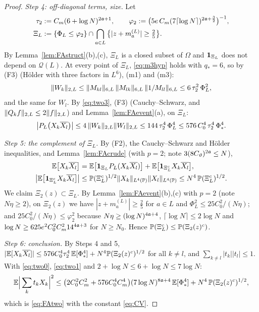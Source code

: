 \begin{proof}
\emph{Step 4: off-diagonal terms, size.} Let
\begin{align*}
 \tau_2&:=C_m(6+\log N)^{2\mathfrak{a}+1},\qquad\varphi_2:=\big(5e\,C_m(7\lceil\log N\rceil)^{2\mathfrak{a}+\frac32}\big)^{-1},\\
 \Xi_L&:=\{\Phi_L\le\varphi_2\}\cap\bigcap_{a\in L}\big\{|z+m_a^{(L)}|\ge\tfrac25\big\}.
\end{align*}
By Lemma~\ref{lem:FAstruct}(b),(c), $\Xi_L$ is a closed subset of $\Omega$ and $\mathbf{1}_{\Xi_L}$ does not depend on $\mathcal Q(L)$. At every point of $\Xi_L$, \eqref{eq:m3hyp} holds with $q_*=6$, so by (F3) (H\"older with three factors in $L^6$), (m1) and (m3):
\[
 \|W_k\|_{2,L}\le\|M_{kl}\|_{6,L}\,\|M_{lk}\|_{6,L}\,\|1/M_{ll}\|_{6,L}\le6\,\tau_2^2\,\Phi_L^2,
\]
and the same for $W_l$. By \eqref{eq:two3}, (F3) (Cauchy--Schwarz, and $\|Q_kf\|_{2,L}\le2\|f\|_{2,L}$) and Lemma~\ref{lem:FAevent}(a), on $\Xi_L$:
\begin{equation}\label{eq:two4}
 \big|P_L\big(X_k\overline{X_l}\big)\big|\le4\,\|W_k\|_{2,L}\|W_l\|_{2,L}\le144\,\tau_2^4\,\Phi_L^4\le576\,C_0^4\,\tau_2^4\,\Phi_*^4 .
\end{equation}

\emph{Step 5: the complement of $\Xi_L$.} By (F2), the Cauchy--Schwarz and H\"older inequalities, and Lemma~\ref{lem:FAcrude} (with $p=2$; note $3(8C_\vartheta)^{2\mathfrak{a}}\le N$),
\begin{align*}
 \mathbb{E}\big[X_k\overline{X_l}\big]&=\mathbb{E}\big[\mathbf{1}_{\Xi_L}P_L(X_k\overline{X_l})\big]+\mathbb{E}\big[\mathbf{1}_{\Xi_L^c}X_k\overline{X_l}\big],\\
 \big|\mathbb{E}\big[\mathbf{1}_{\Xi_L^c}X_k\overline{X_l}\big]\big|&\le\mathbb{P}(\Xi_L^c)^{1/2}\|X_k\|_{L^4(\mathbb{P})}\|X_l\|_{L^4(\mathbb{P})}\le N^4\,\mathbb{P}(\Xi_L^c)^{1/2}.
\end{align*}
We claim $\Xi_2(z)\subset\Xi_L$. By Lemma~\ref{lem:FAevent}(b),(c) with $p=2$ (note $N\eta\ge2$), on $\Xi_2(z)$ we have $|z+m_a^{(L)}|\ge\frac25$ for $a\in L$ and $\Phi_L^2\le25C_0^2/(N\eta)$; and
$25C_0^2/(N\eta)\le\varphi_2^2$ because $N\eta\ge(\log N)^{4\mathfrak{a}+4}$, $\lceil\log N\rceil\le2\log N$ and $\log N\ge625e^2C_0^2C_m^214^{4\mathfrak{a}+3}$ for $N\ge N_0$. Hence $\mathbb{P}(\Xi_L^c)\le\mathbb{P}(\Xi_2(z)^c)$.

\emph{Step 6: conclusion.} By Steps 4 and 5, $|\mathbb{E}[X_k\overline{X_l}]|\le576C_0^4\tau_2^4\,\mathbb{E}[\Phi_*^4]+N^4\mathbb{P}(\Xi_2(z)^c)^{1/2}$ for all $k\ne l$, and $\sum_{k\ne l}|t_k||t_l|\le1$. With \eqref{eq:two0}, \eqref{eq:two1} and $2+\log N\le6+\log N\le7\log N$:
\[
 \mathbb{E}\Big|\sum_kt_kX_k\Big|^2\le\big(2C_0^2C_m^2+576C_0^4C_m^4\big)(7\log N)^{8\mathfrak{a}+4}\,\mathbb{E}[\Phi_*^4]+N^4\,\mathbb{P}(\Xi_2(z)^c)^{1/2},
\]
which is \eqref{eq:FAtwo} with the constant \eqref{eq:CV}.
\end{proof}

